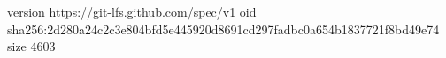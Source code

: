 version https://git-lfs.github.com/spec/v1
oid sha256:2d280a24c2c3e804bfd5e445920d8691cd297fadbc0a654b1837721f8bd49e74
size 4603
